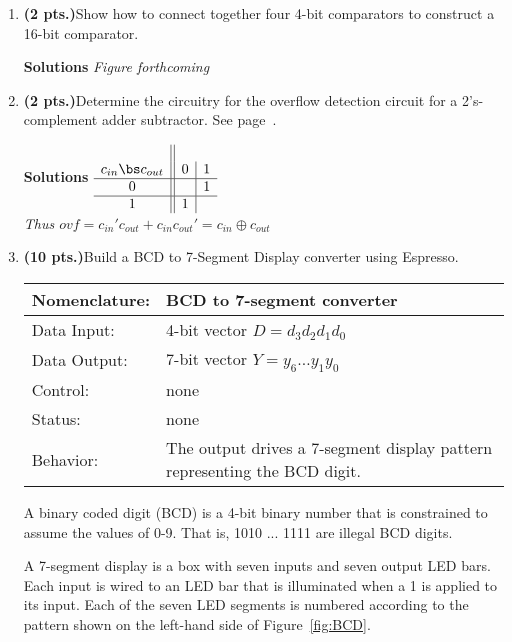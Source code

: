 \begin{enumerate}
\item \textbf{ (2 pts.)}Show how to connect together four 4-bit comparators to
construct a 16-bit comparator.

	\begin{onlysolution} \textbf{Solutions} \itshape{ Figure forthcoming} \end{onlysolution} 

\item \textbf{ (2 pts.)}Determine the circuitry for the overflow detection 
circuit for a 2's-complement adder subtractor.  See page~\pageref{page:Ovf}.

	\begin{onlysolution} \textbf{Solutions} \itshape{
$\begin{array} {c||c|c} \\
 c_{in}  \bs c_{out} & 0 & 1 \\ \hline 
                0    &   & 1 \\ \hline
                1    & 1 &   \\
\end{array}$   \\
Thus $ovf = c_{in}' c_{out} + c_{in} c_{out}' =  c_{in} \oplus c_{out} $
} \end{onlysolution} 


\item \textbf{ (10 pts.)}Build a BCD to 7-Segment Display converter using 
Espresso.  

\label{page:7seg}
\begin{tabular}{|l|p{3.5in}|} \hline
Nomenclature:  & BCD to 7-segment converter                \\ \hline
Data Input:    & 4-bit vector $D=d_3 d_2 d_1 d_0$  \\ \hline
Data Output:   & 7-bit vector $Y=y_6 \ldots y_1 y_0$    \\ \hline
Control:       & none                                   \\ \hline
Status:        & none                                   \\ \hline
Behavior:      & The output drives a 7-segment display pattern
		 representing the BCD digit.  \\ \hline
\end{tabular}

A binary coded digit (BCD) is a 4-bit binary number that is constrained
to assume the values of 0-9. That is, 1010 ... 1111 are illegal BCD digits.

A 7-segment display is a box with seven inputs and seven output LED bars.  
Each input is wired to an LED bar that is illuminated when a 1 is applied 
to its input.
Each of the seven LED segments is numbered according to the pattern shown
on the left-hand side of Figure~\ref{fig:BCD}. 


\end{enumerate}
